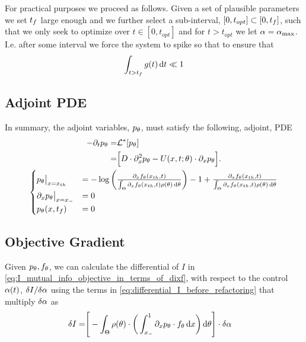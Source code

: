 \documentclass{article}
\begin{document}
\def \topt {{ t_{opt}}}

For practical purposes we proceed as follows. Given a set of plausible
parameters we set ${t_f}$ large enough and we further select a sub-interval,
$[0, \topt] \subset [0, \tf]$, such that we only seek to optimize over $t\in
[0, \topt]$ and for $t > \topt$ we let ${\alpha}= { {\alpha}_{\textrm{max}} }$. I.e. after some interval we
force the system to spike so that to ensure that $$\int_{t>{t_f}} g(t) \, \mathrm{d} t
\ll 1$$

\subsection{Adjoint PDE}
In summary, the adjoint variables, $p_{\theta}$, must satisfy the following, adjoint,
PDE
\begin{equation}
\begin{gathered}
\begin{aligned}
-\di_t p_\th =&  \Lstar[p_\th]
\\ 		=&  \Big[ D\cdot \di^2_x p_\th - U(x,t;\th)   \cdot \di_x p_\th \Big].
\end{aligned}
\\
\begin{cases}
	p_\th \big|_{x=\xth} &=  -\log\left( \frac{\di_xf_\th(\xth, t)}
						{\int_\Theta \di_xf_\th(\xth, t)\rho(\th)\intd{\th} } \right) 
							- 1 
							+ \frac{\di_xf_\th(\xth, t)}
				   					{\int_\Theta \di_xf_\th(\xth, t)\rho(\th)\intd{\th} } $$
	\\
	\di_x p_\th  \big|_{x=\xmin} &= 0
	\\
	p_\th(x,\tf) &= 0
\end{cases}
\label{eq:adjoint_pde_OU}
\end{gathered}
\end{equation}

\subsection{Objective Gradient}
Given $p_{\theta}, f_{\theta}$, we can calculate the differential of $I$ in
\cref{eq:I_mutual_info_objective_in_terms_of_dixf}, with respect to the
control ${\alpha}(t)$, $\delta I / \delta {\alpha}$ using the terms in
\cref{eq:differential_I_before_refactoring} that multiply $\delta {\alpha}$ as 
\begin{align}
\delta I =&  \Bigg[ 
-\int_\Theta  \rho({\theta}) \cdot \bigg(  
 \int_{ x_{-} }^{1} {\partial}_x p_{\theta} \cdot f_{\theta} \, \mathrm{d} x 
    \bigg) \, \mathrm{d} {\theta} \Bigg]\cdot \delta {\alpha}
    \label{eq:objective_gradient_continuous}
\end{align}
\end{document}
